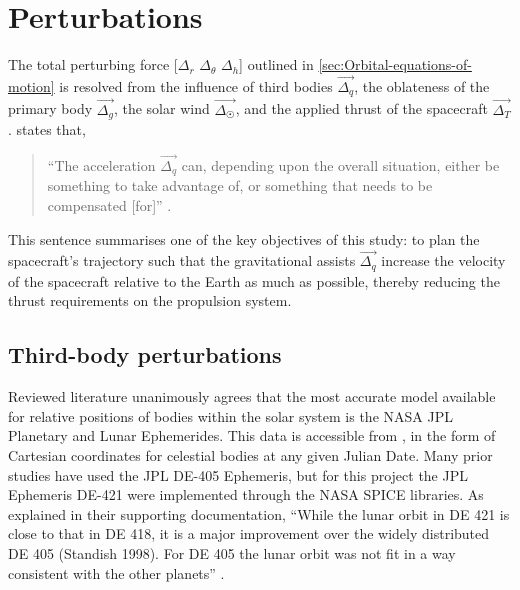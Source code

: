 \section{Perturbations} \label{sec:Perturbations}

The total perturbing force [$\Delta_r$ $\Delta_\theta$ $\Delta_h$] outlined in \autoref{sec:Orbital-equations-of-motion} is resolved from the influence of third bodies $\vec{\Delta_q}$, the oblateness of the primary body $\vec{\Delta_g}$, the solar wind $\vec{\Delta_\Sun}$, and the applied thrust of the spacecraft $\vec{\Delta_T}$. \textcite{Erb_thesis} states that, 
\begin{quotation}\enquote{The acceleration $\vec{\Delta_q}$ can, depending upon the overall situation, either be something to take advantage of, or something that needs to be compensated [for]} \parencite[p. 8]{Erb_thesis}. 
\end{quotation}
This sentence summarises one of the key objectives of this study: to plan the spacecraft's trajectory such that the gravitational assists $\vec{\Delta_q}$ increase the velocity of the spacecraft relative to the Earth as much as possible, thereby reducing the thrust requirements on the propulsion system.



\subsection{Third-body perturbations} \label{sub:Ephemerides}

Reviewed literature unanimously agrees that the most accurate model available for relative positions of bodies within the solar system is the NASA JPL Planetary and Lunar Ephemerides. This data is accessible from \textcite{web_HORIZONS}, in the form of Cartesian coordinates for celestial bodies at any given Julian Date. Many prior studies have used the JPL DE-405 Ephemeris, but for this project the JPL Ephemeris DE-421 were implemented through the NASA SPICE libraries. As explained in their supporting documentation, \enquote{While the lunar orbit in DE 421 is close to that in DE 418, it is a major improvement over the widely distributed DE 405 (Standish 1998). For DE 405 the lunar orbit was not fit in a way consistent with the other planets} \parencite[p. 1]{DE421}.

